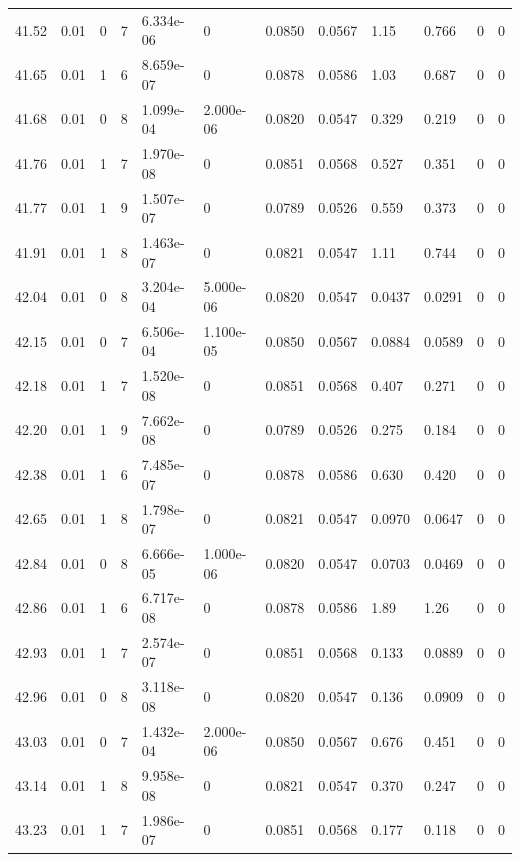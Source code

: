 \documentclass[preview]{standalone}
\begin{document}
{{{{{{{{{{{\begin{tabular}{L{1.2cm}C{1.2cm} C{0.3cm}C{0.5cm} C{1.4cm}C{1.4cm} C{1.4cm}C{1.4cm} C{1.6cm}C{1.6cm} C{1.6cm}C{1.6cm}}
  41.52  &  0.01  & 0     &  7 &  6.334e-06  & 0  &  0.0850&   0.0567& 1.15 & 0.766   &  0 & 0  \\ 
  41.65  &  0.01  & 1     &  6 &  8.659e-07  & 0  &  0.0878&   0.0586& 1.03 & 0.687   &  0 & 0  \\ 
  41.68  &  0.01  & 0     &  8 &  1.099e-04  & 2.000e-06  &  0.0820&   0.0547& 0.329 & 0.219   &  0 & 0  \\ 
  41.76  &  0.01  & 1     &  7 &  1.970e-08  & 0  &  0.0851&   0.0568& 0.527 & 0.351   &  0 & 0  \\ 
  41.77  &  0.01  & 1     &  9 &  1.507e-07  & 0  &  0.0789&   0.0526& 0.559 & 0.373   &  0 & 0  \\ 
  41.91  &  0.01  & 1     &  8 &  1.463e-07  & 0  &  0.0821&   0.0547& 1.11 & 0.744   &  0 & 0  \\ 
  42.04  &  0.01  & 0     &  8 &  3.204e-04  & 5.000e-06  &  0.0820&   0.0547& 0.0437 & 0.0291   &  0 & 0  \\ 
  42.15  &  0.01  & 0     &  7 &  6.506e-04  & 1.100e-05  &  0.0850&   0.0567& 0.0884 & 0.0589   &  0 & 0  \\ 
  42.18  &  0.01  & 1     &  7 &  1.520e-08  & 0  &  0.0851&   0.0568& 0.407 & 0.271   &  0 & 0  \\ 
  42.20  &  0.01  & 1     &  9 &  7.662e-08  & 0  &  0.0789&   0.0526& 0.275 & 0.184   &  0 & 0  \\ 
  42.38  &  0.01  & 1     &  6 &  7.485e-07  & 0  &  0.0878&   0.0586& 0.630 & 0.420   &  0 & 0  \\ 
  42.65  &  0.01  & 1     &  8 &  1.798e-07  & 0  &  0.0821&   0.0547& 0.0970 & 0.0647   &  0 & 0  \\ 
  42.84  &  0.01  & 0     &  8 &  6.666e-05  & 1.000e-06  &  0.0820&   0.0547& 0.0703 & 0.0469   &  0 & 0  \\ 
  42.86  &  0.01  & 1     &  6 &  6.717e-08  & 0  &  0.0878&   0.0586& 1.89 & 1.26   &  0 & 0  \\ 
  42.93  &  0.01  & 1     &  7 &  2.574e-07  & 0  &  0.0851&   0.0568& 0.133 & 0.0889   &  0 & 0  \\ 
  42.96  &  0.01  & 0     &  8 &  3.118e-08  & 0  &  0.0820&   0.0547& 0.136 & 0.0909   &  0 & 0  \\ 
  43.03  &  0.01  & 0     &  7 &  1.432e-04  & 2.000e-06  &  0.0850&   0.0567& 0.676 & 0.451   &  0 & 0  \\ 
  43.14  &  0.01  & 1     &  8 &  9.958e-08  & 0  &  0.0821&   0.0547& 0.370 & 0.247   &  0 & 0  \\ 
  43.23  &  0.01  & 1     &  7 &  1.986e-07  & 0  &  0.0851&   0.0568& 0.177 & 0.118   &  0 & 0  \\ 

\end{tabular}}}}}}}}}}}}
\end{document}
